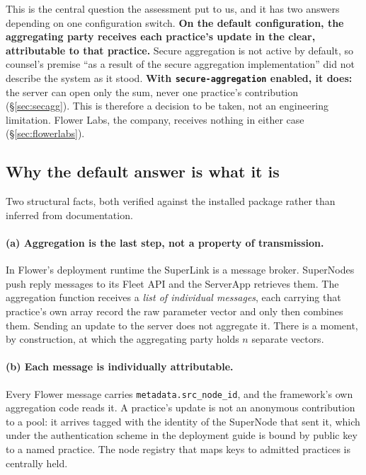 \label{sec:isolation}
\statusMethod

\begin{shortanswer}
This is the central question the assessment put to us, and it has two answers depending on one
configuration switch. \textbf{On the default configuration, the aggregating party receives each
practice's update in the clear, attributable to that practice.} Secure aggregation is not active by
default, so counsel's premise ``as a result of the secure aggregation implementation'' did
not describe the system as it stood. \textbf{With \texttt{secure-aggregation} enabled, it does:} the
server can open only the sum, never one practice's contribution (\S\ref{sec:secagg}). This is
therefore a decision to be taken, not an engineering limitation. Flower Labs, the company, receives
nothing in either case (\S\ref{sec:flowerlabs}).
\end{shortanswer}

\subsection{Why the default answer is what it is}

Two structural facts, both verified against the installed package rather than inferred from
documentation.

\paragraph{(a) Aggregation is the last step, not a property of transmission.}
In Flower's deployment runtime the SuperLink is a message broker. SuperNodes push reply messages to
its Fleet API and the ServerApp retrieves them. The aggregation function receives a \emph{list of
individual messages}, each carrying that practice's own array record the raw parameter vector
and only then combines them. Sending an update to the server does not aggregate it. There is a
moment, by construction, at which the aggregating party holds $n$ separate vectors.

\paragraph{(b) Each message is individually attributable.}
Every Flower message carries \texttt{metadata.\allowbreak src\_\allowbreak node\_\allowbreak id}, and the framework's own aggregation
code reads it. A practice's update is not an anonymous contribution to a pool: it arrives tagged
with the identity of the SuperNode that sent it, which under the authentication scheme in the
deployment guide is bound by public key to a named practice. The node registry that maps keys to
admitted practices is centrally held.

